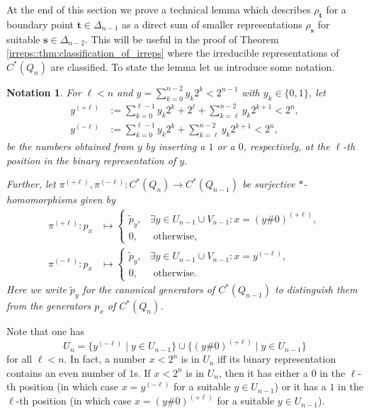 \documentclass[a4paper]{amsart}
\newtheorem{notation}[thm]{Notation}
\begin{document}
At the end of this section we prove a technical lemma which describes $\rho_\mathbf{t}$ for a boundary point $\mathbf{t} \in \Delta_{n-1}$ as a direct sum of smaller representations $\rho_\mathbf{s}$ for suitable $\mathbf{s} \in \Delta_{n-2}$. This will be useful in the proof of Theorem \ref{irreps::thm:classification_of_irreps} where the irreducible representations of $C^\ast(Q_n)$ are classified.
To state the lemma let us introduce some notation.

\begin{notation}
    \label{weig::notation:pi_plus_minus}
    For $\ell < n$ and $y = \sum_{k=0}^{n-2} y_k 2^k < 2^{n-1}$ with $y_k \in \{0,1\}$, let
    \begin{align*}
        y^{(+\ell)} &:= \sum_{k=0}^{\ell-1} y_k 2^k + 2^\ell + \sum_{k=\ell}^{n-2} y_k 2^{k+1} < 2^n, \\
        y^{(-\ell)} &:= \sum_{k=0}^{\ell-1} y_k 2^k + \sum_{k=\ell}^{n-2} y_k 2^{k+1} < 2^n,
    \end{align*}
    be the numbers obtained from $y$ by inserting a $1$ or a $0$, respectively, at the $\ell$-th position in the binary representation of $y$. 

    Further, let $\pi^{(+\ell)}, \pi^{(-\ell)}: C^\ast(Q_n) \to C^\ast(Q_{n-1})$ be surjective $*$-homomorphisms given by
    \begin{align*}
        \pi^{(+\ell)}: p_x &\mapsto \begin{cases}
            \tilde{p}_y, & \exists y \in U_{n-1} \cup V_{n-1}: x = (y \# 0)^{(+\ell)}, \\
            0,           & \text{ otherwise},
        \end{cases} \\
        \pi^{(-\ell)}: p_x &\mapsto \begin{cases}
            \tilde{p}_y, & \exists y \in U_{n-1} \cup V_{n-1}: x = y^{(-\ell)}, \\
            0,           & \text{ otherwise}.
        \end{cases}
    \end{align*}
    Here we write $\tilde{p}_y$ for the canonical generators of $C^\ast(Q_{n-1})$ to distinguish them from the generators $p_x$ of $C^\ast(Q_n)$.
\end{notation}

Note that one has 
$$
U_n = \{y^{(-\ell)} \mid y \in U_{n-1}\} \cup \{(y \# 0)^{(+\ell)} \mid y \in U_{n-1}\}
$$ 
for all $\ell < n$. In fact, a number $x < 2^n$ is in $U_n$ iff its binary representation contains an even number of $1$s. 
If $x < 2^n$ is in $U_n$, then it has either a $0$ in the $\ell$-th position (in which case $x = y^{(-\ell)}$ for a suitable $y \in U_{n-1}$) or it has a $1$ in the $\ell$-th position (in which case $x = (y \# 0)^{(+\ell)}$ for a suitable $y \in U_{n-1}$).
\end{document}
